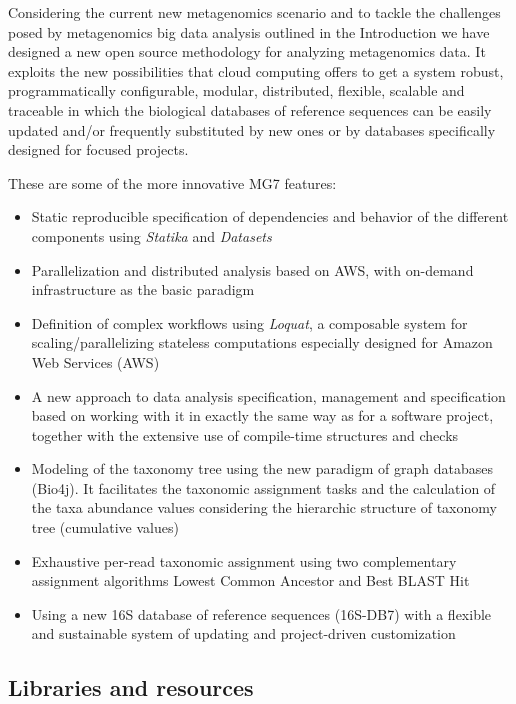 \documentclass{frontiersSCNS} %
\providecommand{\tightlist}{%
\setlength{\itemsep}{0pt}\setlength{\parskip}{0pt}}
\begin{document}
Considering the current new metagenomics scenario and to tackle the
challenges posed by metagenomics big data analysis outlined in the
Introduction we have designed a new open source methodology for
analyzing metagenomics data. It exploits the new possibilities that
cloud computing offers to get a system robust, programmatically
configurable, modular, distributed, flexible, scalable and traceable in
which the biological databases of reference sequences can be easily
updated and/or frequently substituted by new ones or by databases
specifically designed for focused projects.

These are some of the more innovative MG7 features:

\begin{itemize}
\tightlist
\item
  Static reproducible specification of dependencies and behavior of the
  different components using \emph{Statika} and \emph{Datasets}
\item
  Parallelization and distributed analysis based on AWS, with on-demand
  infrastructure as the basic paradigm
\item
  Definition of complex workflows using \emph{Loquat}, a composable
  system for scaling/parallelizing stateless computations especially
  designed for Amazon Web Services (AWS)
\item
  A new approach to data analysis specification, management and
  specification based on working with it in exactly the same way as for
  a software project, together with the extensive use of compile-time
  structures and checks
\item
  Modeling of the taxonomy tree using the new paradigm of graph
  databases (Bio4j). It facilitates the taxonomic assignment tasks and
  the calculation of the taxa abundance values considering the
  hierarchic structure of taxonomy tree (cumulative values)
\item
  Exhaustive per-read taxonomic assignment using two complementary
  assignment algorithms Lowest Common Ancestor and Best BLAST Hit
\item
  Using a new 16S database of reference sequences (16S-DB7) with a
  flexible and sustainable system of updating and project-driven
  customization
\end{itemize}

\subsection{Libraries and resources}\label{libraries-and-resources}
\end{document}
